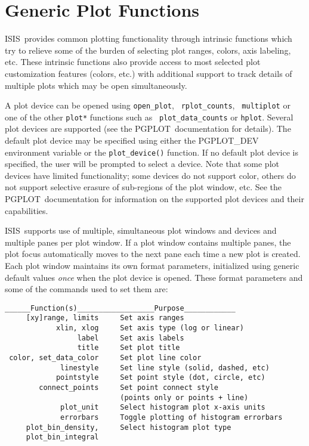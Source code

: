 \documentclass{book}
\newcommand{\isisx}{{\sc ISIS~}}
\newcommand{\pgplot}{{\sc PGPLOT}}
\begin{document}
{\newpage
\section{Generic Plot Functions}
\label{sec:plot-functions}

\isisx provides common plotting functionality through intrinsic functions
which try to relieve some of the burden of selecting plot ranges,
colors, axis labeling, etc.  These intrinsic functions also provide
access to most selected plot customization features (colors, etc.)
with additional support to track details of multiple plots which may
be open simultaneously.

A plot device can be opened using {\tt open\_plot}, {\tt
rplot\_counts}, {\tt
multiplot} or one of the other {\tt *plot*} functions such as {\tt
plot\_data\_counts} or {\tt hplot}. Several plot devices are supported
(see the \pgplot\ documentation for details). The default plot
device may be specified using either the {\sc PGPLOT\_DEV}
environment variable or the {\tt plot\_device()} function. If no
default plot device is specified, the user will be prompted to
select a device.  Note that some plot devices have limited
functionality; some devices do not support color, others do not
support selective erasure of sub-regions of the plot window, etc.
See the \pgplot\ documentation for information on the supported
plot devices and their capabilities.

\isisx supports use of multiple, simultaneous plot windows and devices and
multiple panes per plot window.  If a plot window contains
multiple panes, the plot focus automatically moves to the next
pane each time a new plot is created.  Each plot window maintains
its own format parameters, initialized using generic default
values {\it once} when the plot device is opened. These format
parameters and some of the commands used to set them are:

\begin{verbatim}
______Function(s)__________________Purpose____________
     [xy]range, limits     Set axis ranges
            xlin, xlog     Set axis type (log or linear)
                 label     Set axis labels
                 title     Set plot title
 color, set_data_color     Set plot line color
             linestyle     Set line style (solid, dashed, etc)
            pointstyle     Set point style (dot, circle, etc)
        connect_points     Set point connect style
                           (points only or points + line)
             plot_unit     Select histogram plot x-axis units
             errorbars     Toggle plotting of histogram errorbars
     plot_bin_density,     Select histogram plot type
     plot_bin_integral
\end{verbatim}

}
\end{document}
